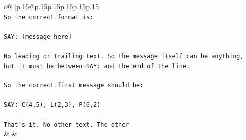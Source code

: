 \documentclass{article}
\begin{document}
{\begin{supertabular}{c@{$\;$}|p{.15\linewidth}@{}p{.15\linewidth}p{.15\linewidth}p{.15\linewidth}p{.15\linewidth}p{.15\linewidth}}
{{{\\ 
\texttt{So the correct format is:} \\
\\ 
\texttt{SAY: {[}message here{]}} \\
\\ 
\texttt{No leading or trailing text. So the message itself can be anything, but it must be between SAY: and the end of the line.} \\
\\ 
\texttt{So the correct first message should be:} \\
\\ 
\texttt{SAY: C(4,5), L(2,3), P(6,2)} \\
\\ 
\texttt{That's it. No other text. The other} \\
            }
        }
    }
    & & \\ \\


\end{supertabular}}
\end{document}
